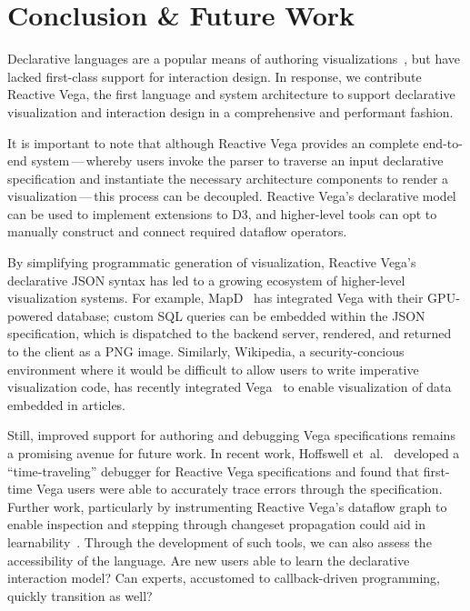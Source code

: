 \section{Conclusion \& Future Work}
\label{sec:vg:conclusion}

Declarative languages are a popular means of authoring
visualizations~\cite{bostock:protovis, bostock:d3, heer:protovisjava}, but have
lacked first-class support for interaction design. In response, we contribute
Reactive Vega, the first language and system architecture to support declarative
visualization and interaction design in a comprehensive and performant fashion.

It is important to note that although Reactive Vega provides an complete
end\--to\--end system\,---\,whereby users invoke the parser to traverse an
input declarative specification and instantiate the necessary architecture
components to render a visualization\,---\,this process can be decoupled.
Reactive Vega's declarative model can be used to implement extensions to D3, and
higher-level tools can opt to manually construct and connect required dataflow
operators.

By simplifying programmatic generation of visualization, Reactive Vega's
declarative JSON syntax has led to a growing ecosystem of higher-level
visualization systems. For example, MapD~\cite{mapd:vega} has integrated Vega
with their GPU-powered database; custom SQL queries can be embedded within the
JSON specification, which is dispatched to the backend server, rendered, and
returned to the client as a PNG image. Similarly, Wikipedia, a security-concious
environment where it would be difficult to allow users to write imperative
visualization code, has recently integrated Vega~\cite{mediawiki:graph} to
enable visualization of data embedded in articles.

Still, improved support for authoring and debugging Vega specifications remains
a promising avenue for future work. In recent work, Hoffswell
et~al.~\cite{hoffswell:debugging} developed a ``time-traveling'' debugger for
Reactive Vega specifications and found that first-time Vega users were able to
accurately trace errors through the specification. Further work, particularly by
instrumenting Reactive Vega's dataflow graph to enable inspection and stepping
through changeset propagation could aid in learnability~\cite{guo:tutor}.
Through the development of such tools, we can also assess the accessibility of
the language. Are new users able to learn the declarative interaction model? Can
experts, accustomed to callback-driven programming, quickly transition as well?

